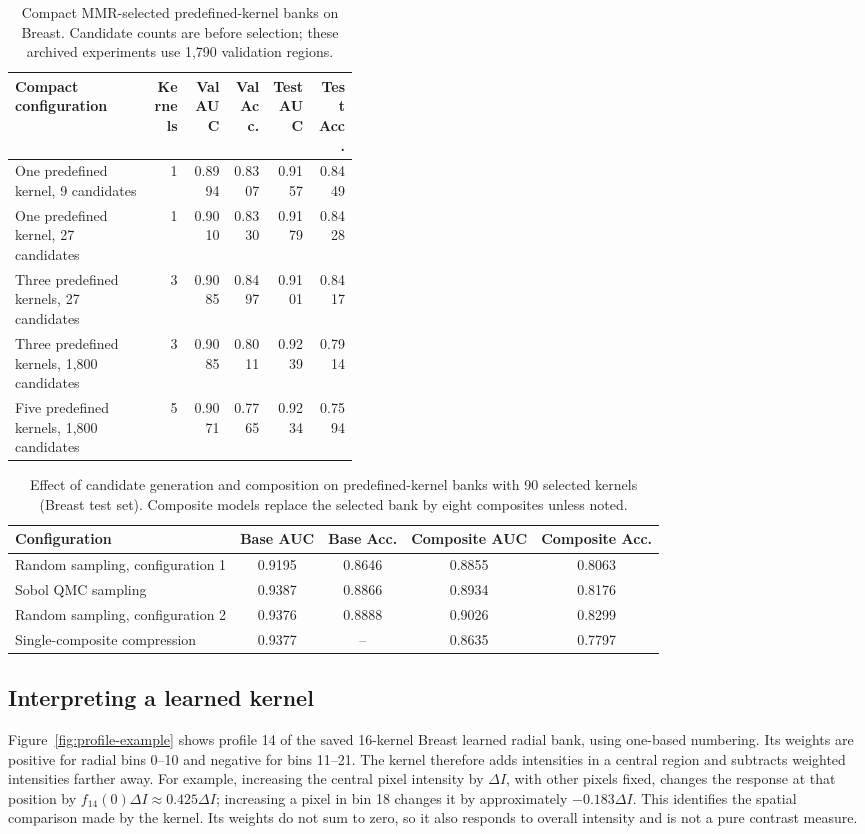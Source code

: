 \documentclass[10pt,twocolumn]{article}
\begin{document}
\begin{table}[!t]
\centering
\caption{Compact MMR-selected predefined-kernel banks on Breast. Candidate counts are before selection; these archived experiments use 1,790 validation regions.}
\label{tab:compact}
\small
\begin{tabular}{p{0.40\linewidth}rrrrr}
\toprule
Compact configuration & Kernels & Val AUC & Val Acc. & Test AUC & Test Acc.\\
\midrule
One predefined kernel, 9 candidates & 1 & 0.8994 & 0.8307 & 0.9157 & 0.8449\\
One predefined kernel, 27 candidates & 1 & 0.9010 & 0.8330 & 0.9179 & 0.8428\\
Three predefined kernels, 27 candidates & 3 & 0.9085 & 0.8497 & 0.9101 & 0.8417\\
Three predefined kernels, 1,800 candidates & 3 & 0.9085 & 0.8011 & 0.9239 & 0.7914\\
Five predefined kernels, 1,800 candidates & 5 & 0.9071 & 0.7765 & 0.9234 & 0.7594\\
\bottomrule
\end{tabular}
\end{table}

\begin{table}[!t]
\centering
\caption{Effect of candidate generation and composition on predefined-kernel banks with 90 selected kernels (Breast test set). Composite models replace the selected bank by eight composites unless noted.}
\label{tab:sampling}
\small
\begin{tabular}{lcccc}
\toprule
Configuration & Base AUC & Base Acc. & Composite AUC & Composite Acc.\\
\midrule
Random sampling, configuration 1 & 0.9195 & 0.8646 & 0.8855 & 0.8063\\
Sobol QMC sampling & 0.9387 & 0.8866 & 0.8934 & 0.8176\\
Random sampling, configuration 2 & 0.9376 & 0.8888 & 0.9026 & 0.8299\\
Single-composite compression & 0.9377 & -- & 0.8635 & 0.7797\\
\bottomrule
\end{tabular}
\end{table}

\subsection{Interpreting a learned kernel}
\label{sec:interpretation}
Figure~\ref{fig:profile-example} shows profile 14 of the saved 16-kernel Breast learned radial bank, using one-based numbering. Its weights are positive for radial bins 0--10 and negative for bins 11--21. The kernel therefore adds intensities in a central region and subtracts weighted intensities farther away. For example, increasing the central pixel intensity by $\Delta I$, with other pixels fixed, changes the response at that position by $f_{14}(0)\Delta I\approx0.425\Delta I$; increasing a pixel in bin 18 changes it by approximately $-0.183\Delta I$. This identifies the spatial comparison made by the kernel. Its weights do not sum to zero, so it also responds to overall intensity and is not a pure contrast measure.
\end{document}
